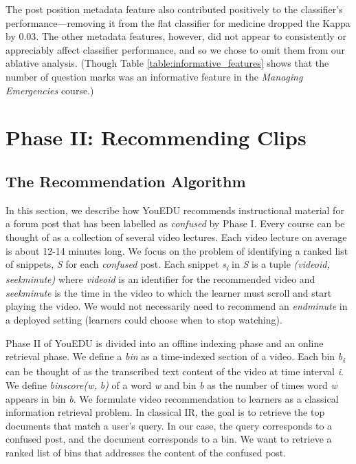 \documentclass{edm_template}
\begin{document}
The post position metadata feature also contributed positively to the classifier's performance---removing it from the flat classifier for medicine dropped the Kappa by 0.03. The other metadata features, however, did not appear to consistently or appreciably affect classifier performance, and so we chose to omit them from our ablative analysis. (Though Table \ref{table:informative_features} shows that the number of question marks was  an informative feature in the \emph{Managing Emergencies} course.)

\section{Phase II: Recommending Clips}
\label{sec:clipRecommendation}
\vspace{1mm}
\subsection{The Recommendation Algorithm}
\vspace{1mm}
In this section, we describe how YouEDU recommends instructional material for a forum post that
has been labelled as \textit{confused} by Phase I. Every course can be thought of as a collection of several video lectures. Each video lecture on average is about 12-14 minutes long. We focus on the problem of identifying a ranked list of snippets, \textit{S} for each \textit{confused} post. Each snippet \textit{s\textsubscript i} in \textit{S} is a tuple \textit{(video\textunderscore id, seek\textunderscore minute)} where \textit{video\textunderscore id} is an identifier for the recommended video and \textit{seek\textunderscore minute} is the time in the video to which the learner must scroll and start playing the video. We would not necessarily need to recommend an \textit{end\textunderscore minute} in a deployed setting (learners could choose when to stop watching).

Phase II of YouEDU is divided into an offline indexing phase and an online retrieval phase.
We define a \textit {bin} as a time-indexed section of a video. Each bin \textit{b\textsubscript{i}} can be thought of as the transcribed text content of the video
at time interval \textit{i}. We define \textit{binscore(w, b)} of a word \textit{w} and bin \textit{b} as the number of times word \textit{w} appears in bin \textit{b}. We formulate video recommendation to learners as a classical information retrieval problem. In classical IR, the goal is to retrieve the top documents that match a user's query. In our case, the query corresponds to a confused post, and the document corresponds to a bin. We want to retrieve a ranked list of bins that addresses the content of the confused post.
\end{document}
